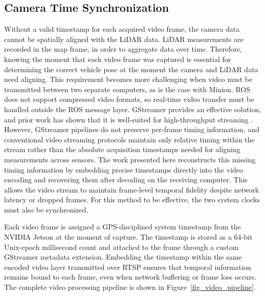 \documentclass{erauthesis}
\begin{document}
\subsection{Camera Time Synchronization} \label{time_sync_cam}

Without a valid timestamp for each acquired video frame, the camera data cannot be spatially aligned with the LiDAR data.
LiDAR measurements are recorded in the map frame, in order to aggregate data over time. Therefore, knowing the moment that each video frame was captured is essential for determining the correct vehicle pose at the moment the camera and LiDAR data need aligning. 
This requirement becomes more challenging when video must be transmitted between two separate computers, as is the case with Minion. 
ROS does not support compressed video formats, so real-time video transfer must be handled outside the ROS message layer. 
GStreamer provides an effective solution, and prior work has shown that it is well-suited for high-throughput streaming \cite{thompson2023}. 
However, GStreamer pipelines do not preserve per-frame timing information, and conventional video streaming protocols maintain only relative timing within the stream rather than the absolute acquisition timestamps needed for aligning measurements across sensors. 
The work presented here reconstructs this missing timing information by embedding precise timestamps directly into the video encoding and recovering them after decoding on the receiving computer. 
This allows the video stream to maintain frame-level temporal fidelity despite network latency or dropped frames.
For this method to be effective, the two system clocks must also be synchronized.

Each video frame is assigned a GPS-disciplined system timestamp from the NVIDIA Jetson at the moment of capture. The timestamp is stored as a 64-bit Unix-epoch millisecond count and attached to the frame through a custom GStreamer metadata extension. Embedding the timestamp within the same encoded video layer transmitted over \ac{RTSP} ensures that temporal information remains bound to each frame, even when network buffering or frame loss occurs. The complete video processing pipeline is shown in Figure~\ref{fig_video_pipeline}.
\end{document}
